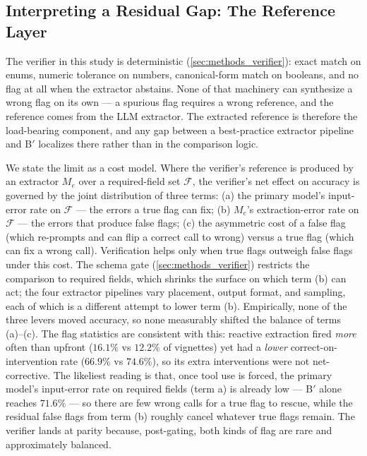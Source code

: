\subsection{Interpreting a Residual Gap: The Reference Layer}
\label{sec:disc_extractor}

The verifier in this study is deterministic
(\cref{sec:methods_verifier}): exact match on enums, numeric tolerance
on numbers, canonical-form match on booleans, and no flag at all when
the extractor abstains. None of that machinery can synthesize a wrong
flag on its own --- a spurious flag requires a wrong reference, and the
reference comes from the LLM extractor. The extracted reference is
therefore the load-bearing component, and any gap between a
best-practice extractor pipeline and B$'$ localizes there rather than
in the comparison logic.

We state the limit as a cost model. Where the verifier's reference is
produced by an extractor $M_e$ over a required-field set $\mathcal{F}$,
the verifier's net effect on accuracy is governed by the joint
distribution of three terms:
(a) the primary model's input-error rate on $\mathcal{F}$ --- the
errors a true flag can fix;
(b) $M_e$'s extraction-error rate on $\mathcal{F}$ --- the errors that
produce false flags;
(c) the asymmetric cost of a false flag (which re-prompts and can flip
a correct call to wrong) versus a true flag (which can fix a wrong
call).
Verification helps only when true flags outweigh false flags under
this cost. The schema gate (\cref{sec:methods_verifier}) restricts the
comparison to required fields, which shrinks the surface on which term
(b) can act; the four extractor pipelines vary placement, output
format, and sampling, each of which is a different attempt to lower
term (b). Empirically, none of the three levers moved accuracy, so none
measurably shifted the balance of terms (a)--(c). The flag statistics
are consistent with this: reactive extraction fired \emph{more} often
than upfront ($16.1\%$ vs $12.2\%$ of vignettes) yet had a \emph{lower}
correct-on-intervention rate ($66.9\%$ vs $74.6\%$), so its extra
interventions were not net-corrective. The likeliest reading is that,
once tool use is forced, the primary model's input-error rate on
required fields (term a) is already low --- B$'$ alone reaches
$71.6\%$ --- so there are few wrong calls for a true flag to rescue,
while the residual false flags from term (b) roughly cancel whatever
true flags remain. The verifier lands at parity because, post-gating,
both kinds of flag are rare and approximately balanced.

